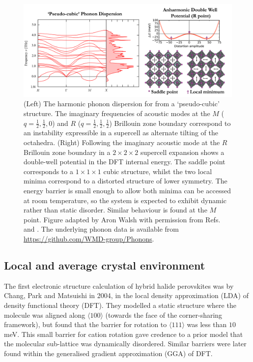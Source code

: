 \begin{figure}
\includegraphics[width=1.0\columnwidth]{./figures/ch2/f2.png}
\caption[ phonon dispersion and double-well potential energy surface]{
    (Left) The harmonic phonon dispersion for  from a `pseudo-cubic' structure. 
    The imaginary frequencies of acoustic modes at the $M$ ($q=\frac{1}{2},\frac{1}{2},0$) and $R$ ($q = \frac{1}{2}, \frac{1}{2}, \frac{1}{2}$) Brillouin zone boundary correspond to an instability expressible in a supercell as alternate tilting of the octahedra.
    (Right) Following the imaginary acoustic mode at the $R$ Brillouin zone boundary in a $2\times2\times2$ supercell expansion shows a double-well potential in the DFT internal energy. 
    The saddle point corresponds to a $1\times1\times1$ cubic structure, whilst the two local minima correspond to a distorted structure of lower symmetry. 
The energy barrier is small enough to allow both minima can be accessed at room temperature, so the system is expected to exhibit dynamic rather than static disorder. 
Similar behaviour is found at the $M$ point. 
Figure adapted by Aron Walsh with permission from Refs. \cite{Whalley2016} and \cite{Beecher2016a}.
The underlying phonon data is available from \url{https://github.com/WMD-group/Phonons}.
}
\label{fig2}
\end{figure}

\subsection{Local and average crystal environment} \label{localaverage}

The first electronic structure calculation of hybrid halide perovskites was by Chang, Park and Matsuishi in 2004, \autocite{Chang2004}
in the local density approximation (LDA) of density functional theory (DFT).
They modelled a static structure where the  molecule was aligned along $\langle100\rangle$ (towards the face of the corner-sharing  framework), but found that the barrier for rotation to $\langle111\rangle$ was less than $10$ meV. 
This small barrier for cation rotation gave credence to a prior model that the molecular sub-lattice was dynamically disordered.\autocite{Poglitsch1987c}
Similar barriers were later found within the generalised gradient approximation (GGA) of DFT.\autocite{Brivio2013} 

